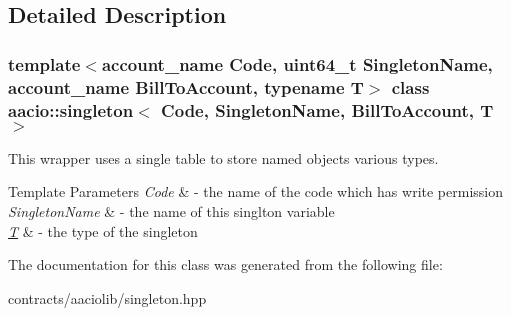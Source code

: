 \subsection{Detailed Description}
\subsubsection*{template$<$account\+\_\+name Code, uint64\+\_\+t Singleton\+Name, account\+\_\+name Bill\+To\+Account, typename T$>$\newline
class aacio\+::singleton$<$ Code, Singleton\+Name, Bill\+To\+Account, T $>$}

This wrapper uses a single table to store named objects various types.


\begin{DoxyTemplParams}{Template Parameters}
{\em Code} & -\/ the name of the code which has write permission \\
\hline
{\em Singleton\+Name} & -\/ the name of this singlton variable \\
\hline
{\em \mbox{\hyperlink{struct_t}{T}}} & -\/ the type of the singleton \\
\hline
\end{DoxyTemplParams}


The documentation for this class was generated from the following file\+:\begin{DoxyCompactItemize}
\item 
contracts/aaciolib/singleton.\+hpp\end{DoxyCompactItemize}
